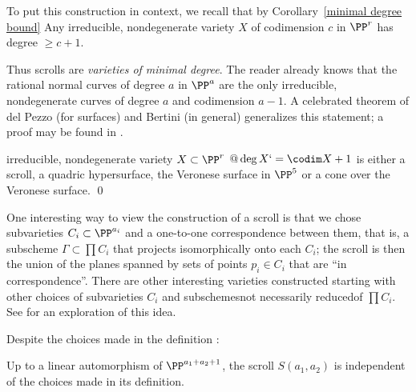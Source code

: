To put this construction in context, we recall that by
Corollary~\ref{minimal degree bound}
Any irreducible, nondegenerate variety $X$ of codimension $c$ in
$\PP^{r}$ has degree $\geq c +1$.

Thus scrolls are \emph{varieties of minimal degree}. The reader already
%
knows that the rational normal curves of degree $a$ in $\PP^{a}$ are the
only irreducible, nondegenerate curves of degree $a$ and codimension
$a-1$. A celebrated theorem of del Pezzo (for surfaces) and Bertini
%
%
(in general) generalizes this statement;
a proof may be found in \cite{Eisenbud-Harris-Centennial}.

\begin{theorem}\label{classification of scrolls}
irreducible, nondegenerate variety $X\subset \PP^{r}$  
$@\deg X `=
\codim X+1$ is either a 
scroll, a quadric hypersurface,
the Veronese surface in $\PP^{5}$ or a cone over the Veronese surface.
\qed
\end{theorem}

One interesting way to view the construction of a scroll is that we chose
subvarieties $C_{i}\subset \PP^{a_{i}}$ and a one-to-one correspondence
between them, that is, a subscheme
$\Gamma\subset \prod C_{i}$ that projects isomorphically onto each
$C_{i}$; the scroll is then the
union of the planes spanned by sets of points $p_{i}\in C_{i}$ that
are ``in correspondence''. There are other interesting varieties
constructed starting with other choices of subvarieties $C_{i}$ and
subschemes\emdash not necessarily reduced\emdash of $\prod C_{i}$. See
%
\cite{Eisenbud-Sammartano} for an exploration of this idea.

Despite the choices made in the definition 
:

\begin{proposition}\label{uniqueness of scrolls}
Up to a linear automorphism of $\PP^{a_1+a_2+1}$,
%
the scroll $S(a_1,a_2)$ is independent of the choices made in its
definition.
\unif
\end{proposition}

